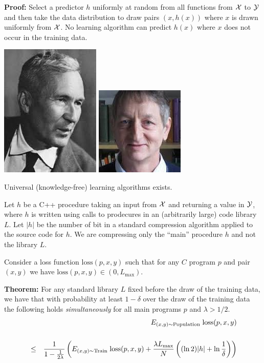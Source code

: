 {\vfill
{\bf Proof:} Select a predictor $h$ uniformly at random from all functions from ${\cal X}$ to ${\cal Y}$ and then take the data distribution to draw pairs $(x, h(x))$
where $x$ is drawn uniformly from ${\cal X}$.  No learning algorithm can predict $h(x)$ where $x$ does not occur in the training data.


\includegraphics[height=1.0 in]{../images/Kolmogorov}
\includegraphics[height=1.0 in]{../images/Hinton}

Universal (knowledge-free) learning algorithms exists.

\vfill
Let $h$ be a C++ procedure taking an input from ${\cal X}$ and returning a value in ${\cal Y}$, where $h$ is written using calls to prodecures in an (arbitrarily large) code library $L$.
Let $|h|$ be the number of bit in a standard compression algorithm applied to the source code for $h$.  We are compressing only the ``main'' procedure $h$ and not the library $L$.


Consider a loss function $\mathrm{loss}(p,x,y)$ such that for any $C$ program $p$ and pair $(x,y)$ we have
$\mathrm{loss}(p,x,y) \in (0,L_\mathrm{max})$.

\vfill
    {\bf Theorem:} For any standard library $L$ fixed before the draw of the training data, we have that with probability
    at least $1-\delta$ over the draw of the training data the following holds {\em simultaneously} for all main programs $p$
    and $\lambda > 1/2$.
    \begin{eqnarray*}
      & & E_{(x,y)\sim \mathrm{Population}}\;\mathrm{loss}(p,x,y) \\
      \\
      & \leq & \frac{1}{1-\frac{1}{2\lambda}}\left(E_{(x,y) \sim \mathrm{Train}}\;\mathrm{loss}(p,x,y)
          + \frac{\lambda L_\mathrm{max}}{N}\left((\ln 2)|h| + \ln\frac{1}{\delta}\right)\right)
      \end{eqnarray*}

}
